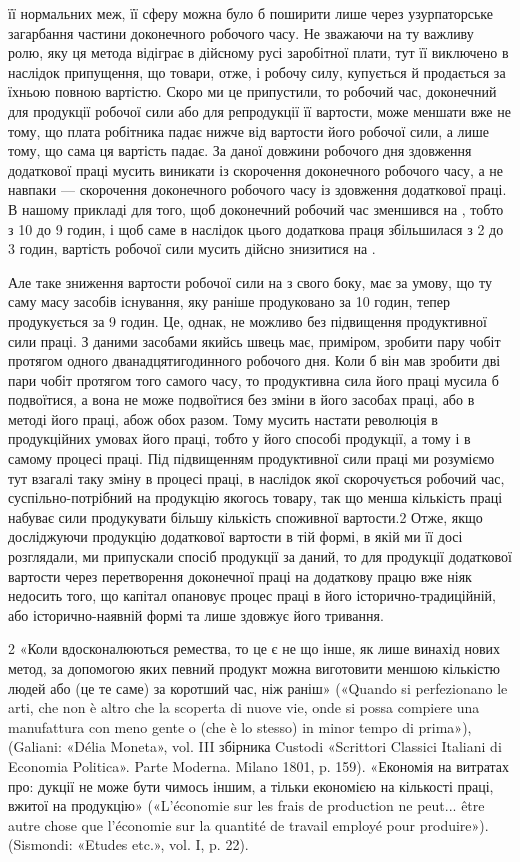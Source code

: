 її нормальних меж, її сферу можна було б поширити лише через
узурпаторське загарбання частини доконечного робочого часу.
Не зважаючи на ту важливу ролю, яку ця метода відіграє в дійсному
русі заробітної плати, тут її виключено в наслідок припущення,
що товари, отже, і робочу силу, купується й продається
за їхньою повною вартістю. Скоро ми це припустили, то робочий
час, доконечний для продукції робочої сили або для репродукції
її вартости, може меншати вже не тому, що плата робітника падає
нижче від вартости його робочої сили, а лише тому, що сама ця
вартість падає. За даної довжини робочого дня здовження додаткової
праці мусить виникати із скорочення доконечного робочого
часу, а не навпаки — скорочення доконечного робочого часу із
здовження додаткової праці. В нашому прикладі для того, щоб
доконечний робочий час зменшився на , тобто з 10 до 9 годин,
і щоб саме в наслідок цього додаткова праця збільшилася з 2 до
3 годин, вартість робочої сили мусить дійсно знизитися на .

Але таке зниження вартости робочої сили на  з свого боку,
має за умову, що ту саму масу засобів існування, яку раніше
продуковано за 10 годин, тепер продукується за 9 годин. Це, однак,
не можливо без підвищення продуктивної сили праці. З даними
засобами якийсь швець має, приміром, зробити пару чобіт
протягом одного дванадцятигодинного робочого дня. Коли б він
мав зробити дві пари чобіт протягом того самого часу, то продуктивна
сила його праці мусила б подвоїтися, а вона не може подвоїтися
без зміни в його засобах праці, або в методі його праці,
абож обох разом. Тому мусить настати революція в продукційних
умовах його праці, тобто у його способі продукції, а тому і в самому
процесі праці. Під підвищенням продуктивної сили праці ми розуміємо
тут взагалі таку зміну в процесі праці, в наслідок якої
скорочується робочий час, суспільно-потрібний на продукцію
якогось товару, так що менша кількість праці набуває сили продукувати
більшу кількість споживної вартости.2 Отже, якщо
досліджуючи продукцію додаткової вартости в тій формі, в якій
ми її досі розглядали, ми припускали спосіб продукції за даний,
то для продукції додаткової вартости через перетворення доконечної
праці на додаткову працю вже ніяк недосить того, що
капітал опановує процес праці в його історично-традиційній,
або історично-наявній формі та лише здовжує його тривання.

2 «Коли вдосконалюються ремества, то це є не що інше, як лише
винахід нових метод, за допомогою яких певний продукт можна виготовити
меншою кількістю людей або (це те саме) за коротший час, ніж
раніш» («Quando si perfezionano le arti, che non è altro che la scoperta
di nuove vie, onde si possa compiere una manufattura con meno gente o
(che è lo stesso) in minor tempo di prima»), (Galiani: «Délia Moneta»,
vol. III збірника Custodi «Scrittori Classici Italiani di Economia Politica».
Parte Moderna. Milano 1801, p. 159). «Економія на витратах про:
дукції не може бути чимось іншим, а тільки економією на кількості
праці, вжитої на продукцію» («L'économie sur les frais de production
ne peut... être autre chose que l’économie sur la quantité de travail employé
pour produire»). (Sismondi: «Etudes etc.», vol. I, p. 22).
